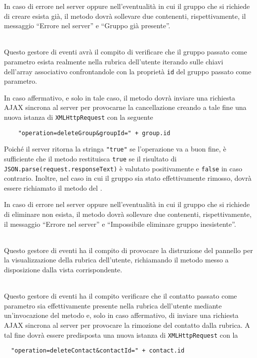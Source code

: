 \begin{description}
In caso di errore nel server oppure nell'eventualità in cui il gruppo che si richiede di creare esista già, il metodo dovrà sollevare due  contenenti, rispettivamente, il messaggio ``Errore nel server'' e ``Gruppo già presente''.

\item{}\\
Questo gestore di eventi avrà il compito di verificare che il gruppo passato come parametro esista realmente nella rubrica dell'utente iterando sulle chiavi dell'array associativo  confrontandole con la proprietà \verb'id' del gruppo passato come parametro.

In caso affermativo, e solo in tale caso, il metodo dovrà inviare una richiesta AJAX sincrona al server per provocarne la cancellazione creando a tale fine una nuova istanza di \verb'XMLHttpRequest' con la seguente 
\begin{verbatim}
    "operation=deleteGroup&groupId=" + group.id
\end{verbatim}

Poiché il server ritorna la stringa \verb'"true"' se l'operazione va a buon fine, è sufficiente che il metodo restituisca \verb'true' se il risultato di \verb'JSON.parse(request.responseText)' è valutato positivamente e \texttt{false} in caso contrario. Inoltre, nel caso in cui il gruppo sia stato effettivamente rimosso, dovrà essere richiamato il metodo  del .

In caso di errore nel server oppure nell'eventualità in cui il gruppo che si richiede di eliminare non esista, il metodo dovrà sollevare due  contenenti, rispettivamente, il messaggio ``Errore nel server'' e ``Impossibile eliminare gruppo inesistente''.

\item{}\\
Questo gestore di eventi ha il compito di provocare la distruzione del pannello per la visualizzazione della rubrica dell'utente, richiamando il metodo  messo a disposizione dalla vista corrispondente.

\item{}\\
Questo gestore di eventi ha il compito verificare che il contatto passato come parametro sia effettivamente presente nella rubrica dell'utente mediante un'invocazione del metodo  e, solo in caso affermativo, di inviare una richiesta AJAX sincrona al server per provocare la rimozione del contatto dalla rubrica. A tal fine dovrà essere predisposta una nuova istanza di \verb'XMLHttpRequest' con la 
\begin{verbatim}
  "operation=deleteContact&contactId=" + contact.id
\end{verbatim}


\end{description}
